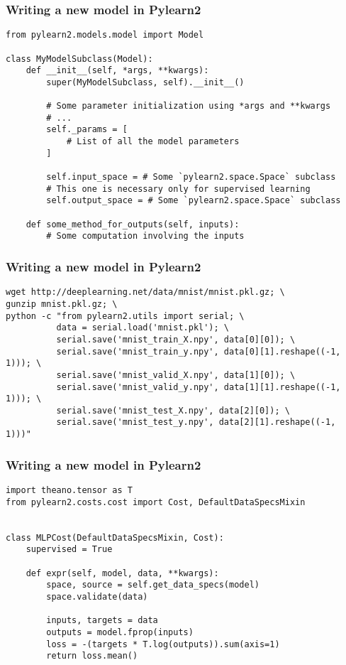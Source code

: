 \documentclass[mathserif, xcolor=dvipsnames]{beamer}
\begin{document}
\begin{frame}[fragile]
    \frametitle{Writing a new model in Pylearn2}
    \begin{examples}
\begin{lstlisting}[caption=Model subclass implementation mockup]
from pylearn2.models.model import Model

class MyModelSubclass(Model):
    def __init__(self, *args, **kwargs):
        super(MyModelSubclass, self).__init__()

        # Some parameter initialization using *args and **kwargs
        # ...
        self._params = [
            # List of all the model parameters
        ]

        self.input_space = # Some `pylearn2.space.Space` subclass
        # This one is necessary only for supervised learning
        self.output_space = # Some `pylearn2.space.Space` subclass

    def some_method_for_outputs(self, inputs):
        # Some computation involving the inputs
\end{lstlisting}
    \end{examples}
\end{frame}

\begin{frame}[fragile]
    \frametitle{Writing a new model in Pylearn2}
    \begin{examples}
\begin{lstlisting}[caption=Format the data for Pylearn2]
wget http://deeplearning.net/data/mnist/mnist.pkl.gz; \
gunzip mnist.pkl.gz; \
python -c "from pylearn2.utils import serial; \
          data = serial.load('mnist.pkl'); \
          serial.save('mnist_train_X.npy', data[0][0]); \
          serial.save('mnist_train_y.npy', data[0][1].reshape((-1, 1))); \
          serial.save('mnist_valid_X.npy', data[1][0]); \
          serial.save('mnist_valid_y.npy', data[1][1].reshape((-1, 1))); \
          serial.save('mnist_test_X.npy', data[2][0]); \
          serial.save('mnist_test_y.npy', data[2][1].reshape((-1, 1)))"
\end{lstlisting}
    \end{examples}
\end{frame}

\begin{frame}[fragile]
    \frametitle{Writing a new model in Pylearn2}
    \begin{examples}
\begin{lstlisting}[caption=Cost implementation for MLP]
import theano.tensor as T
from pylearn2.costs.cost import Cost, DefaultDataSpecsMixin


class MLPCost(DefaultDataSpecsMixin, Cost):
    supervised = True

    def expr(self, model, data, **kwargs):
        space, source = self.get_data_specs(model)
        space.validate(data)

        inputs, targets = data
        outputs = model.fprop(inputs)
        loss = -(targets * T.log(outputs)).sum(axis=1)
        return loss.mean()
\end{lstlisting}
    \end{examples}
\end{frame}
\end{document}
